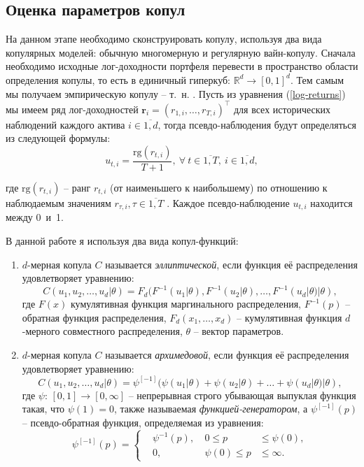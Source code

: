 \subsection{Оценка параметров копул}
\label{methodology:copula}

На данном этапе необходимо сконструировать копулу, используя два вида копулярных моделей: обычную многомерную и регулярную вайн-копулу. 
Сначала необходимо исходные лог-доходности портфеля перевести в пространство области определения копулы, то есть в единичный гиперкуб: $\mathbb{R}^d \to [0, 1]^d$. Тем самым мы получаем эмпирическую копулу -- т.~н. . 
Пусть из уравнения (\ref{log-returns}) мы имеем ряд лог-доходностей $\boldsymbol{r}_i = (r_{1,i}, \ldots, r_{T,i})^\intercal$ для всех исторических наблюдений каждого актива $i \in \overline{1,d}$, тогда псевдо-наблюдения будут определяться из следующей формулы:
%
\begin{equation} \label{pobs}
    u_{t,i} = \frac{\text{rg}(r_{t,i})}{T + 1},\ \forall \ t \in \overline{1,T},\ i \in \overline{1,d},
\end{equation}

\noindent где $\text{rg}(r_{t,i})$ -- ранг $r_{t,i}$ (от наименьшего к наибольшему) по отношению к наблюдаемым значениям $r_{\tau,i}, \tau \in \overline{1,T}$ \cite{Copula}. Каждое псевдо-наблюдение $u_{t,i}$ находится между 0~и~1.

В данной работе я используя два вида копул-функций:
%
\begin{enumerate}[(1)]
\item $d$-мерная копула $C$ называется \textit{эллиптической}, если функция её распределения удовлетворяет уравнению:
\begin{equation} \label{EllipCop}
    C(u_1, u_2, \ldots,u_d|\theta) = F_d(F^{-1}(u_1|\theta),F^{-1}(u_2|\theta), \ldots,F^{-1}(u_d|\theta)|\theta),
\end{equation}
где $F(x)$ кумулятивная функция маргинального распределения, $F^{-1}(p)$ -- обратная функция распределения, $F_d(x_1,\dots,x_d)$ -- кумулятивная функция $d$-мерного совместного распределения, $\theta$ -- вектор параметров.

\item $d$-мерная копула $C$ называется \textit{архимедовой}, если функция её распределения удовлетворяет уравнению:
\begin{equation} \label{ArchCop}
    C(u_1,u_2,\ldots,u_d|\theta) = \psi^{[-1]}(\psi(u_1|\theta)+\psi(u_2|\theta) + \ldots + \psi(u_d|\theta) | \theta ),
\end{equation}
где $\psi$: $[0,1] \rightarrow [0, \infty]$ -- непрерывная строго убывающая выпуклая функция такая, что $\psi(1)=0$, также называемая \textit{функцией-генератором}, а $\psi^{[-1]}(p)$ -- псевдо-обратная функция, определяемая из уравнения:
$$\psi^{[-1]}(p) = \left\{ \begin{aligned}
    & \psi^{-1}(p),    & \ 0 \le p & \le \psi(0), \\
    & 0,                  & \ \psi(0) \le p & \le \infty.
\end{aligned} \right.$$
\end{enumerate}

